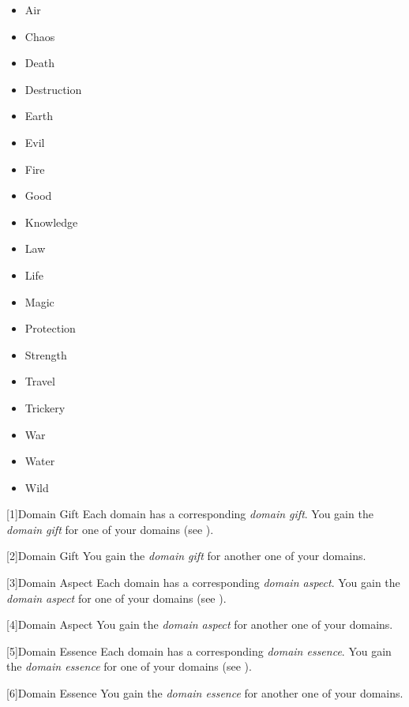        \begin{itemize}
            \item{Air}
            \item{Chaos}
            \item{Death}
            \item{Destruction}
            \item{Earth}
            \item{Evil}
            \item{Fire}
            \item{Good}
            \item{Knowledge}
            \item{Law}
            \item{Life}
            \item{Magic}
            \item{Protection}
            \item{Strength}
            \item{Travel}
            \item{Trickery}
            \item{War}
            \item{Water}
            \item{Wild}
        \end{itemize}

        [1]{Domain Gift}
        Each domain has a corresponding \textit{domain gift}.
        You gain the \textit{domain gift} for one of your domains (see ).

        [2]{Domain Gift}
        You gain the \textit{domain gift} for another one of your domains.

        [3]{Domain Aspect}
        Each domain has a corresponding \textit{domain aspect}.
        You gain the \textit{domain aspect} for one of your domains (see ).

        [4]{Domain Aspect}
        You gain the \textit{domain aspect} for another one of your domains.

        [5]{Domain Essence}
        Each domain has a corresponding \textit{domain essence}.
        You gain the \textit{domain essence} for one of your domains (see ).

        [6]{Domain Essence}
        You gain the \textit{domain essence} for another one of your domains.

